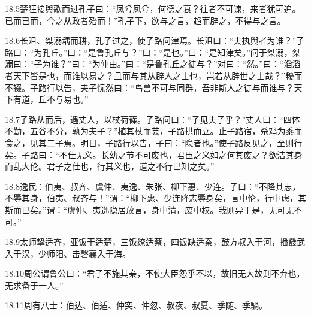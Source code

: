 \documentclass[a4paper,12pt,UTF8,twoside]{ctexbook}
\begin{document}
18.5楚狂接舆歌而过孔子曰：“凤兮凤兮，何德之衰？往者不可谏，来者犹可追。已而已而，今之从政者殆而！”孔子下，欲与之言，趋而辟之，不得与之言。

18.6长沮、桀溺耦而耕，孔子过之，使子路问津焉。长沮曰：“夫执舆者为谁？”子路曰：“为孔丘。”曰：“是鲁孔丘与？”曰：“是也。”曰：“是知津矣。”问于桀溺，桀溺曰：“子为谁？”曰：“为仲由。”曰：“是鲁孔丘之徒与？”对曰：“然。”曰：“滔滔者天下皆是也，而谁以易之？且而与其从辟人之士也，岂若从辟世之士哉？”耰而不辍。子路行以告，夫子怃然曰：“鸟兽不可与同群，吾非斯人之徒与而谁与？天下有道，丘不与易也。”

18.7子路从而后，遇丈人，以杖荷蓧。子路问曰：“子见夫子乎？”丈人曰：“四体不勤，五谷不分，孰为夫子？”植其杖而芸，子路拱而立。止子路宿，杀鸡为黍而食之，见其二子焉。明日，子路行以告，子曰：“隐者也。”使子路反见之，至则行矣。子路曰：“不仕无义。长幼之节不可废也，君臣之义如之何其废之？欲洁其身而乱大伦。君子之仕也，行其义也，道之不行已知之矣。”

18.8逸民：伯夷、叔齐、虞仲、夷逸、朱张、柳下惠、少连。子曰：“不降其志，不辱其身，伯夷、叔齐与！”谓：“柳下惠、少连降志辱身矣，言中伦，行中虑，其斯而已矣。”谓：“虞仲、夷逸隐居放言，身中清，废中权。我则异于是，无可无不可。”

18.9太师挚适齐，亚饭干适楚，三饭缭适蔡，四饭缺适秦，鼓方叔入于河，播鼗武入于汉，少师阳、击磬襄入于海。

18.10周公谓鲁公曰：“君子不施其亲，不使大臣怨乎不以，故旧无大故则不弃也，无求备于一人。”

18.11周有八士：伯达、伯适、仲突、仲忽、叔夜、叔夏、季随、季騧。
\end{document}
